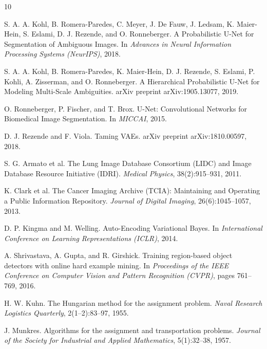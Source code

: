 \documentclass{article}
\begin{document}

\begin{thebibliography}{10}

S. A. A. Kohl, B. Romera-Paredes, C. Meyer, J. De Fauw, J. Ledsam, K. Maier-Hein, S. Eslami, D. J. Rezende, and O. Ronneberger.  
\newblock A Probabilistic U-Net for Segmentation of Ambiguous Images.  
\newblock In \emph{Advances in Neural Information Processing Systems (NeurIPS)}, 2018.

S. A. A. Kohl, B. Romera-Paredes, K. Maier-Hein, D. J. Rezende, S. Eslami, P. Kohli, A. Zisserman, and O. Ronneberger.  
\newblock A Hierarchical Probabilistic U-Net for Modeling Multi-Scale Ambiguities.  
\newblock arXiv preprint arXiv:1905.13077, 2019.

O. Ronneberger, P. Fischer, and T. Brox.  
\newblock U-Net: Convolutional Networks for Biomedical Image Segmentation.  
\newblock In \emph{MICCAI}, 2015.

D. J. Rezende and F. Viola.  
\newblock Taming VAEs.  
\newblock arXiv preprint arXiv:1810.00597, 2018.

S. G. Armato et al.  
\newblock The Lung Image Database Consortium (LIDC) and Image Database Resource Initiative (IDRI).  
\newblock \emph{Medical Physics}, 38(2):915–931, 2011.

K. Clark et al.  
\newblock The Cancer Imaging Archive (TCIA): Maintaining and Operating a Public Information Repository.  
\newblock \emph{Journal of Digital Imaging}, 26(6):1045–1057, 2013.

D. P. Kingma and M. Welling.  
\newblock Auto-Encoding Variational Bayes.  
\newblock In \emph{International Conference on Learning Representations (ICLR)}, 2014.

A. Shrivastava, A. Gupta, and R. Girshick.  
\newblock Training region-based object detectors with online hard example mining.  
\newblock In \emph{Proceedings of the IEEE Conference on Computer Vision and Pattern Recognition (CVPR)}, pages 761–769, 2016.

H. W. Kuhn.  
\newblock The Hungarian method for the assignment problem.  
\newblock \emph{Naval Research Logistics Quarterly}, 2(1--2):83--97, 1955.

J. Munkres.  
\newblock Algorithms for the assignment and transportation problems.  
\newblock \emph{Journal of the Society for Industrial and Applied Mathematics}, 5(1):32--38, 1957.



\end{thebibliography}
\end{document}

